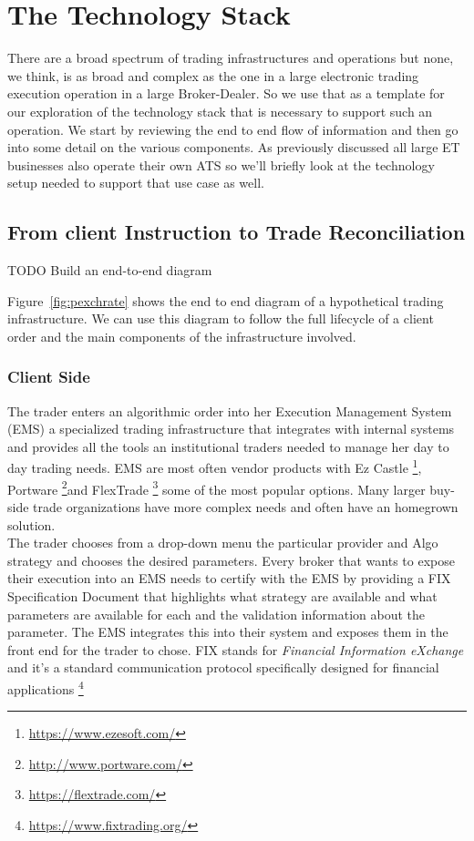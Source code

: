 
\chapter{The Technology Stack}
There are a broad spectrum of trading infrastructures and operations but none, we think, is as broad and complex as the one in a large electronic trading execution operation in a large Broker-Dealer. So we use that as a template for our exploration of the technology stack that is necessary to support such an operation. We start by reviewing the end to end flow of information and then go into some detail on the various components. As previously discussed all large ET businesses also operate their own ATS so we'll briefly look at the technology setup needed to support that use case as well.\\

\section{From client Instruction to Trade Reconciliation}
TODO Build an end-to-end diagram

Figure~\ref{fig:pexchrate} shows the end to end diagram of a hypothetical trading infrastructure. We can use this diagram to follow the full lifecycle of a client order and the main components of the infrastructure involved.
\subsection{Client Side}
The trader enters an algorithmic order into her Execution Management System (EMS) a specialized trading infrastructure that integrates with internal systems and provides all the tools an institutional traders needed to manage her day to day trading needs. EMS are most often vendor products with Ez Castle \footnote{\url{https://www.ezesoft.com/}}, Portware \footnote{\url{http://www.portware.com/}}and FlexTrade \footnote{\url{https://flextrade.com/}} some of the most popular options. Many larger buy-side trade organizations have more complex needs and often have an homegrown solution.\\

The trader chooses from a drop-down menu the particular provider and Algo strategy and  chooses the desired parameters. Every broker that wants to expose their execution into an EMS needs to certify with the EMS by providing a FIX Specification Document that highlights what strategy are available and what parameters are available for each and the validation information about the parameter. The EMS integrates this into their system and exposes them in the front end for the trader to chose. FIX stands for \emph{Financial Information eXchange} and it's a standard communication protocol specifically designed for financial applications \footnote{\url{https://www.fixtrading.org/}}\\

